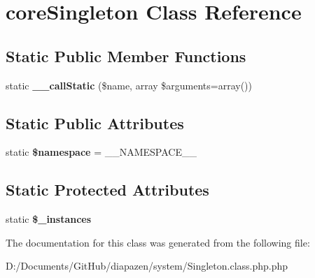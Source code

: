 \section{core\-Singleton Class Reference}
\label{classcore_singleton}
\subsection*{Static Public Member Functions}
\begin{DoxyCompactItemize}
\item 
static {\bfseries \-\_\-\-\_\-call\-Static} (\$name, array \$arguments=array())\label{classcore_singleton_a7b34b1bb7f5045d7d05e6b5bd907aabb}

\end{DoxyCompactItemize}
\subsection*{Static Public Attributes}
\begin{DoxyCompactItemize}
\item 
static {\bfseries \$namespace} = \-\_\-\-\_\-\-N\-A\-M\-E\-S\-P\-A\-C\-E\-\_\-\-\_\-\label{classcore_singleton_a3825c9b9060c2d6ef594385997cd60aa}

\end{DoxyCompactItemize}
\subsection*{Static Protected Attributes}
\begin{DoxyCompactItemize}
\item 
static {\bfseries \$\-\_\-instances}\label{classcore_singleton_a184e634b52323f577a8d345206d690a1}

\end{DoxyCompactItemize}


The documentation for this class was generated from the following file\-:\begin{DoxyCompactItemize}
\item 
D\-:/\-Documents/\-Git\-Hub/diapazen/system/Singleton.\-class.\-php.\-php\end{DoxyCompactItemize}
